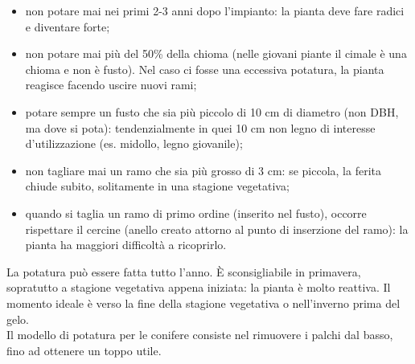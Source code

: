 \begin{itemize}[nosep]
    \item non potare mai nei primi 2-3 anni dopo l'impianto: la pianta deve fare radici e diventare forte; 
    \item non potare mai più del 50\% della chioma (nelle giovani piante il cimale è una chioma e non è fusto). Nel caso ci fosse una eccessiva potatura, la pianta reagisce facendo uscire nuovi rami;
    \item potare sempre un fusto che sia più piccolo di 10 cm di diametro (non DBH, ma dove si pota): tendenzialmente in quei 10 cm non legno di interesse d'utilizzazione (es. midollo, legno giovanile);
    \item non tagliare mai un ramo che sia più grosso di 3 cm: se piccola, la ferita chiude subito, solitamente in una stagione vegetativa;
    \item quando si taglia un ramo di primo ordine (inserito nel fusto), occorre rispettare il cercine (anello creato attorno al punto di inserzione del ramo): la pianta ha maggiori difficoltà a ricoprirlo. 
\end{itemize}
La potatura può essere fatta tutto l'anno. È sconsigliabile in primavera, sopratutto a stagione vegetativa appena iniziata: la pianta è molto reattiva. Il momento ideale è verso la fine della stagione vegetativa o nell'inverno prima del gelo.\\
Il modello di potatura per le conifere consiste nel rimuovere i palchi dal basso, fino ad ottenere un toppo utile. 